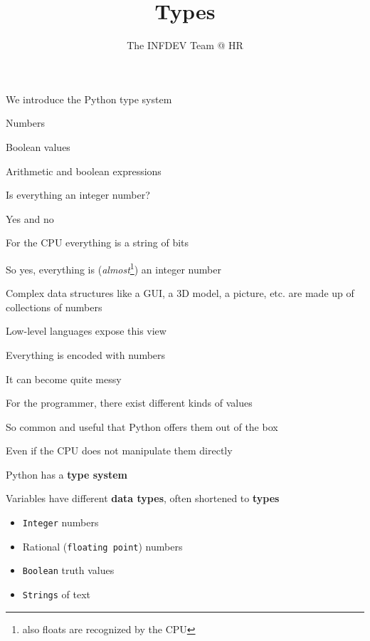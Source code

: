 \documentclass{beamer}
\title{Types}
\author{The INFDEV Team @ HR}
\institute{Hogeschool Rotterdam \\ 
Rotterdam, Netherlands}
\date{}
\begin{document}
\maketitle

\begin{slide}{
\item We introduce the Python type system
\item Numbers
\item Boolean values
\item Arithmetic and boolean expressions
}\end{slide}

\begin{slide}{
\item Is everything an integer number?
\item Yes and no
}\end{slide}

\begin{slide}{
\item For the CPU everything is a string of bits
\item So yes, everything is (\textit{almost}\footnote{also floats are recognized by the CPU}) an integer number
\item Complex data structures like a GUI, a 3D model, a picture, etc. are made up of collections of numbers
}\end{slide}

\begin{slide}{
\item Low-level languages expose this view
\item Everything is encoded with numbers
\item It can become quite messy
}\end{slide}

\begin{slide}{
\item For the programmer, there exist different kinds of values
\item So common and useful that Python offers them out of the box
\item Even if the CPU does not manipulate them directly
}\end{slide}

\begin{slide}{
\item Python has a \textbf{type system}
\item Variables have different \textbf{data types}, often shortened to \textbf{types}
\begin{itemize}
\item \texttt{Integer} numbers
\item Rational (\texttt{floating point}) numbers
\item \texttt{Boolean} truth values
\item \texttt{Strings} of text
\end{itemize}
}\end{slide}
\end{document}
